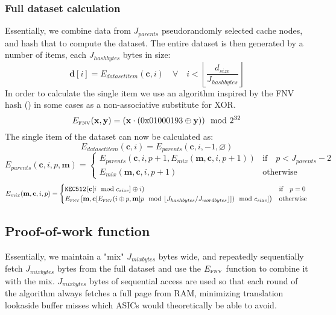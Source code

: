\documentclass[9pt,oneside]{amsart}
\begin{document}
\subsubsection{Full dataset calculation} \label{dataset}
Essentially, we combine data from $J_{parents}$ pseudorandomly selected cache nodes, and hash that to compute the dataset. The entire dataset is then generated by a number of items, each $J_{hashbytes}$ bytes in size:
\begin{equation}
 \mathbf{d}[i] = E_{datasetitem}(\mathbf{c}, i) \quad \forall \quad i < \left\lfloor\frac{d_{size}}{J_{hashbytes}}\right\rfloor
\end{equation}
In order to calculate the single item we use an algorithm inspired by the FNV hash (\cite{FowlerNollVo1991FNVHash}) in some cases as a non-associative substitute for XOR.
\begin{equation}
 E_\text{\tiny FNV}(\mathbf{x}, \mathbf{y}) = (\mathbf{x} \cdot (\mathrm{0x01000193} \oplus \mathbf{y})) \mod 2^{32}
\end{equation}
The single item of the dataset can now be calculated as:
\begin{equation}
 E_{datasetitem}(\mathbf{c}, i) = E_{parents}(\mathbf{c}, i, -1, \varnothing)
\end{equation}
\begin{equation}
  E_{parents}(\mathbf{c}, i, p, \mathbf{m}) = \begin{cases}
E_{parents}(\mathbf{c}, i, p +1, E_{mix}(\mathbf{m}, \mathbf{c}, i, p + 1)) & \text{if} \quad p < J_{parents} -2 \\
E_{mix}(\mathbf{m}, \mathbf{c}, i, p + 1) & \text{otherwise}
\end{cases}
\end{equation}
\begin{equation}
 E_{mix}(\mathbf{m}, \mathbf{c}, i, p) = \begin{cases}
\texttt{KEC512}(\mathbf{c}[i \mod c_{size}] \oplus i) & \text{if} \quad p = 0 \\
E_\text{\tiny FNV}\big(\mathbf{m}, \mathbf{c}[E_\text{\tiny FNV}(i \oplus p, \mathbf{m}[p \mod \lfloor J_{hashbytes} / J_{wordbytes} \rfloor]) \mod c_{size}] \big) & \text{otherwise}
\end{cases}
\end{equation}

\subsection{Proof-of-work function}
Essentially, we maintain a "mix" $J_{mixbytes}$ bytes wide, and repeatedly sequentially fetch $J_{mixbytes}$ bytes from the full dataset and use the $E_\text{\tiny FNV}$ function to combine it with the mix. $J_{mixbytes}$ bytes of sequential access are used so that each round of the algorithm always fetches a full page from RAM, minimizing translation lookaside buffer misses which ASICs would theoretically be able to avoid.
\end{document}
